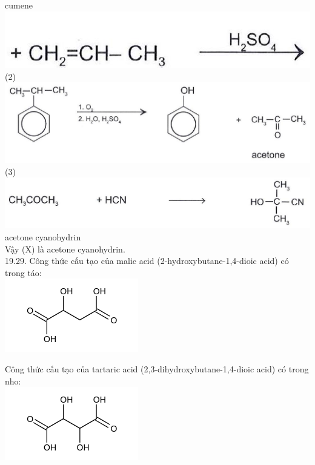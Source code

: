 \documentclass[10pt]{article}
\begin{document}
cumene\\
\includegraphics[max width=\textwidth, center]{2025_10_23_adad5b98d65ac6665838g-43(3)}\\
(2)\\
\includegraphics[max width=\textwidth, center]{2025_10_23_adad5b98d65ac6665838g-43(2)}\\
(3)\\
\includegraphics[max width=\textwidth, center]{2025_10_23_adad5b98d65ac6665838g-43}\\
acetone cyanohydrin\\
Vậy (X) là acetone cyanohydrin.\\
19.29. Công thức cấu tạo của malic acid (2-hydroxybutane-1,4-dioic acid) có trong táo:\\
\includegraphics{smile-0df4e136b5a479630b313c912d125567b682c629}

Công thức cấu tạo của tartaric acid (2,3-dihydroxybutane-1,4-dioic acid) có trong nho:\\
\includegraphics{smile-4038d1a37853e8cba4f963a4d529497cb45637de}
\end{document}
